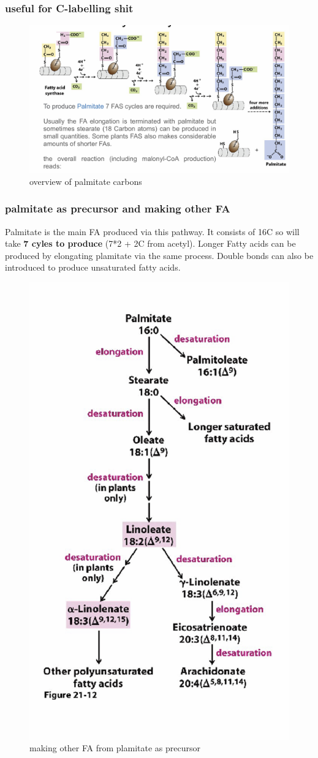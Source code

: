 \documentclass[../main.tex]{subfiles}
\begin{document}
\subsubsection{useful for C-labelling shit}
\begin{figure}[H]
    \centering
    \includegraphics[width=\linewidth]{overviewPalmitate.png}
    \caption{overview of palmitate carbons}
    \label{fig:enter-label}
\end{figure}



\subsubsection{palmitate as precursor and making other FA}
Palmitate is the main FA produced via this pathway. It consists of 16C so will take \textbf{7 cyles to produce} (7*2 + 2C from acetyl). Longer Fatty acids can be produced by elongating plamitate via the same process. Double bonds can also be introduced to produce unsaturated fatty acids.
\begin{figure}[H]
    \centering
    \includegraphics[width=0.5\linewidth]{palmitate_stuff.png}
    \caption{making other FA from plamitate as precursor}
    \label{fig:enter-label}
\end{figure}
\end{document}
